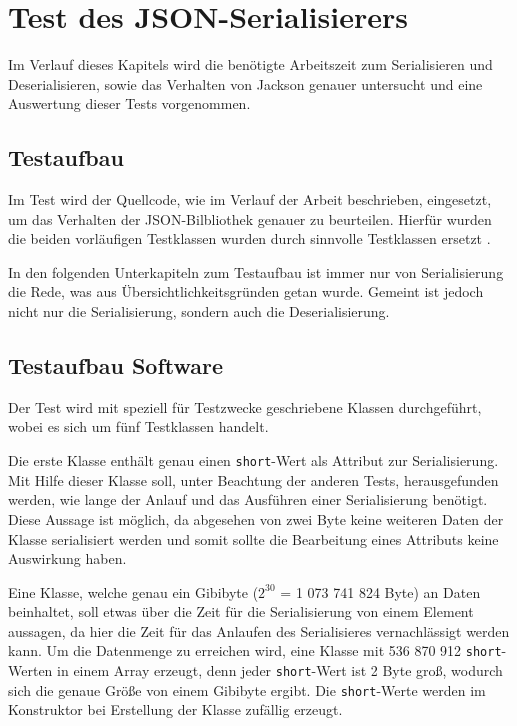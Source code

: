 \section{Test des JSON-Serialisierers}
Im Verlauf dieses Kapitels wird die ben\"otigte Arbeitszeit zum Serialisieren und Deserialisieren, sowie das Verhalten von Jackson genauer untersucht und eine Auswertung dieser Tests vorgenommen.

\subsection{Testaufbau}
Im Test wird der Quellcode, wie im Verlauf der Arbeit beschrieben, eingesetzt, um das Verhalten der \ac{JSON}-Bilbliothek genauer zu beurteilen.
Hierf\"ur wurden die beiden vorl\"aufigen Testklassen wurden durch sinnvolle Testklassen ersetzt .

In den folgenden Unterkapiteln zum Testaufbau ist immer nur von Serialisierung die Rede, was aus \"Ubersichtlichkeitsgr\"unden getan wurde. Gemeint ist jedoch nicht nur die Serialisierung, sondern auch die Deserialisierung.

\subsection{Testaufbau Software}
Der Test wird mit speziell f\"ur Testzwecke geschriebene Klassen durchgef\"uhrt, wobei es sich um f\"unf Testklassen handelt.

Die erste Klasse enth\"alt genau einen \texttt{short}-Wert als Attribut zur Serialisierung. Mit Hilfe dieser Klasse soll, unter Beachtung der anderen Tests, herausgefunden werden, wie lange der Anlauf und das Ausf\"uhren einer Serialisierung ben\"otigt. Diese Aussage ist m\"oglich, da abgesehen von zwei Byte keine weiteren Daten der Klasse serialisiert werden und somit sollte die Bearbeitung eines Attributs keine Auswirkung haben.

Eine Klasse, welche genau ein Gibibyte ($2^{30}$ = 1 073 741 824 Byte) an Daten beinhaltet, soll etwas \"uber die Zeit f\"ur die Serialisierung von einem Element aussagen, da hier die Zeit f\"ur das Anlaufen des Serialisieres vernachl\"assigt werden kann.
Um die Datenmenge zu erreichen wird, eine Klasse mit 536 870 912 \texttt{short}-Werten in einem Array erzeugt, denn jeder \texttt{short}-Wert ist 2 Byte gro\ss{}, wodurch sich die genaue Gr\"o\ss{}e von einem Gibibyte ergibt. Die \texttt{short}-Werte werden im Konstruktor bei Erstellung der Klasse zuf\"allig erzeugt.


